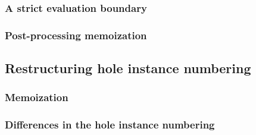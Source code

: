 \subsubsection{A strict evaluation boundary}
\label{sec:strict_eval_boundary}

\subsubsection{Post-processing memoization}
\label{sec:memoization}

\subsection{Restructuring hole instance numbering}
\label{sec:restructuring_hole_numbering}



\subsubsection{Memoization}
\label{sec:renumbering_memoization}

\subsubsection{Differences in the hole instance numbering}
\label{sec:differences_numbering}

